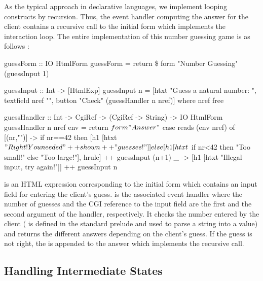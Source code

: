 As the typical approach in declarative languages,
we implement looping constructs by recursion.
Thus, the event handler computing the answer for the client
contains a recursive call to the initial form
which implements the interaction loop.
The entire implementation of this number guessing game
is as follows :
%
\begin{curry}
guessForm :: IO HtmlForm
guessForm = return \$ form "Number Guessing" (guessInput 1)

guessInput :: Int -> [HtmlExp]
guessInput n =
  [htxt "Guess a natural number: ", textfield nref "",
   button "Check" (guessHandler n nref)]   where nref free

guessHandler :: Int -> CgiRef -> (CgiRef -> String) -> IO HtmlForm
guessHandler n nref env =
  return $ form "Answer" $
    case reads (env nref) of
      [(nr,"")] ->
            if nr==42
              then [h1 [htxt $ "Right! You needed "++show n++" guesses!"]]
              else [h1 [htxt $ if nr<42 then "Too small!"
                                        else "Too large!"],
                    hrule] ++ guessInput (n+1)
      _ -> [h1 [htxt "Illegal input, try again!"]] ++ guessInput n
\end{curry}
%
 is an HTML expression corresponding to
the initial form which contains an
input field for entering the client's guess.
 is the associated event handler where the
number of guesses and the
CGI reference to the input field are the first and the second argument
of the handler, respectively.
It checks the number entered by the client
( is defined in the standard prelude
and used to parse a string into a value)
and returns the different answers depending on the client's guess.
If the guess is not right, the  is appended
to the answer which implements the recursive call.


\subsection{Handling Intermediate States}
\label{sec-intermediate-state}

